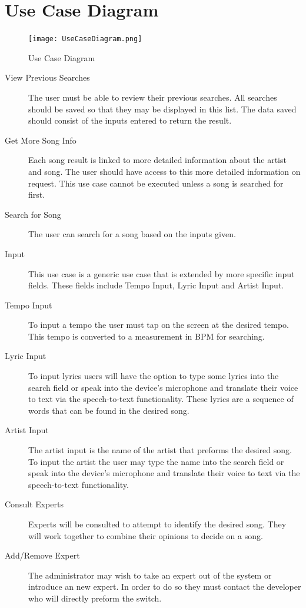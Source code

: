 \documentclass[]{article}
\begin{document}
\section{Use Case Diagram}
\label{sec:use_case_diagram}
\begin{figure}[!ht]
	\centering
	\texttt{[image: UseCaseDiagram.png]}
	\caption{Use Case Diagram}
\end{figure}
\begin{description}
	\item[View Previous Searches] The user must be able to review their previous searches. All searches should be saved so that they may be displayed in this list. The data saved should consist of the inputs entered to return the result.
	\item[Get More Song Info] Each song result is linked to more detailed information about the artist and song. The user should have access to this more detailed information on request. This use case cannot be executed unless a song is searched for first.
	\item[Search for Song] The user can search for a song based on the inputs given.
	\item[Input] This use case is a generic use case that is extended by more specific input fields. These fields include Tempo Input, Lyric Input and Artist Input.
	\item[Tempo Input] To input a tempo the user must tap on the screen at the desired tempo. This tempo is converted to a measurement in BPM for searching.
	\item[Lyric Input] To input lyrics users will have the option to type some lyrics into the search field or speak into the device's microphone and translate their voice to text via the speech-to-text functionality. These lyrics are a sequence of words that can be found in the desired song.
	\item[Artist Input] The artist input is the name of the artist that preforms the desired song. To input the artist the user may type the name into the search field or speak into the device's microphone and translate their voice to text via the speech-to-text functionality.
	\item[Consult Experts] Experts will be consulted to attempt to identify the desired song. They will work together to combine their opinions to decide on a song.
	\item[Add/Remove Expert] The administrator may wish to take an expert out of the system or introduce an new expert. In order to do so they must contact the developer who will directly preform the switch. 
\end{description}
\FloatBarrier %
\end{document}
